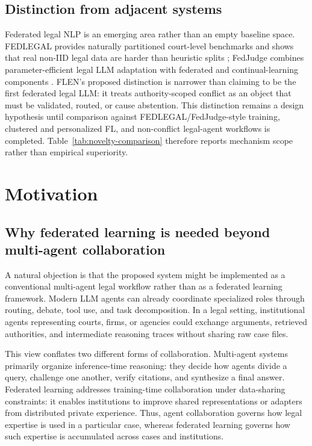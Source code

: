 \documentclass[preprint,12pt,authoryear]{elsarticle}
\begin{document}
\subsection{Distinction from adjacent systems}

Federated legal NLP is an emerging area rather than an empty baseline space. FEDLEGAL provides naturally partitioned court-level benchmarks and shows that real non-IID legal data are harder than heuristic splits \citep{Zhang2023FEDLEGALTF}; FedJudge combines parameter-efficient legal LLM adaptation with federated and continual-learning components \citep{Yue2023FedJudgeFL}. FLEN's proposed distinction is narrower than claiming to be the first federated legal LLM: it treats authority-scoped conflict as an object that must be validated, routed, or cause abstention. This distinction remains a design hypothesis until comparison against FEDLEGAL/FedJudge-style training, clustered and personalized FL, and non-conflict legal-agent workflows is completed. Table~\ref{tab:novelty-comparison} therefore reports mechanism scope rather than empirical superiority.




\section{Motivation}
\subsection{Why federated learning is needed beyond multi-agent collaboration}
A natural objection is that the proposed system might be implemented as a conventional multi-agent legal workflow rather than as a federated learning framework. Modern LLM agents can already coordinate specialized roles through routing, debate, tool use, and task decomposition. In a legal setting, institutional agents representing courts, firms, or agencies could exchange arguments, retrieved authorities, and intermediate reasoning traces without sharing raw case files.

This view conflates two different forms of collaboration. Multi-agent systems primarily organize inference-time reasoning: they decide how agents divide a query, challenge one another, verify citations, and synthesize a final answer. Federated learning addresses training-time collaboration under data-sharing constraints: it enables institutions to improve shared representations or adapters from distributed private experience. Thus, agent collaboration governs how legal expertise is used in a particular case, whereas federated learning governs how such expertise is accumulated across cases and institutions.
\end{document}
